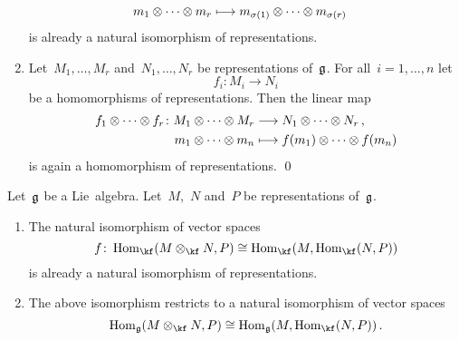\begin{proposition}
\begin{enumerate}
\begin{align*}
        \\
        m_1 \tensor \dotsb \tensor m_r
        &\mapsto
        m_{\sigma(1)} \tensor \dotsb \tensor m_{\sigma(r)}
      \end{align*}
      is already a natural isomorphism of representations.
    \item
      Let~$M_1, \dotsc, M_r$ and~$N_1, \dotsc, N_r$ be representations of~$\mathfrak{g}$.
      For all~$i = 1, \dotsc, n$ let
      \[
        f_i \colon M_i \to N_i
      \]
      be a homomorphisms of representations.
      Then the linear map
      \begin{align*}
        f_1 \tensor \dotsb \tensor f_r
        \colon
        M_1 \tensor \dotsb \tensor M_r
        &\to
        N_1 \tensor \dotsb \tensor N_r \,,
        \\
        m_1 \tensor \dotsb \tensor m_n
        &\mapsto
        f(m_1) \tensor \dotsb \tensor f(m_n)
      \end{align*}
      is again a homomorphism of representations.
    \qed
  \end{enumerate}
\end{proposition}


\begin{proposition}
  \label{checking enriched tensor hom adjunction}
  Let~$\mathfrak{g}$ be a Lie~algebra.
  Let~$M$,~$N$ and~$P$ be representations of~$\mathfrak{g}$.
  \begin{enumerate}
    \item
      The natural isomorphism of vector spaces
      \[
        f
        \colon
        \Hom_{\kf}( M \otimes_{\kf} N, P )
        \cong
        \Hom_{\kf}( M, \Hom_{\kf}(N, P) )
      \]
      is already a natural isomorphism of representations.
    \item
      The above isomorphism restricts to a natural isomorphism of vector spaces
      \[
        \Hom_{\glie}( M \otimes_{\kf} N, P )
        \cong
        \Hom_{\glie}( M, \Hom_{\kf}(N, P) ) \,.
      \]
  \end{enumerate}
\end{proposition}



